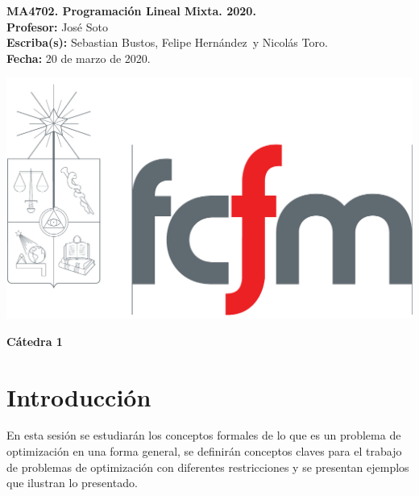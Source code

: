 \documentclass[10pt]{article}
\theoremstyle{plain}
\theoremstyle{definition}
\newcommand{\sca}{Sebastian Bustos}
\newcommand{\scb}{Felipe Hernández}
\newcommand{\scc}{Nicolás Toro}
\newcommand{\catnum}{1} %
\newcommand{\fecha}{20 de marzo de 2020}
\begin{document}
\vspace*{-1.2 cm}
\begin{minipage}{0.6\textwidth}
\begin{flushleft}
\hspace*{-0.5cm}\textbf{MA4702. Programación Lineal Mixta. 2020.}\\
\hspace*{-0.5cm}\textbf{Profesor:} José Soto\\
\hspace*{-0.5cm}\textbf{Escriba(s):} \sca, \scb ~y \scc.\\
\hspace*{-0.5cm}\textbf{Fecha:} \fecha.
\end{flushleft}
\end{minipage}
\begin{minipage}{0.36\textwidth}
\begin{flushright}
\includegraphics[scale=0.15]{fcfm}
\end{flushright}
\end{minipage}
\bigskip

\begin{center}
\LARGE\textbf{Cátedra \catnum}
\end{center}


\section*{Introducción}

En esta sesión se estudiarán los conceptos formales de lo que es un problema de optimización en una forma general, se definirán conceptos claves para el trabajo de problemas de optimización con diferentes restricciones y se presentan ejemplos que ilustran lo presentado.
\end{document}
